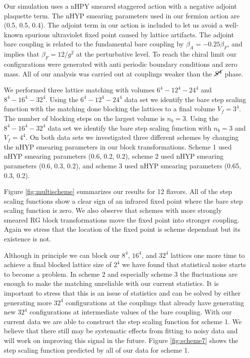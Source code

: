 \documentclass{PoS}
\newcommand{\Sb}{\ensuremath{\cancel{S^4}} }
\begin{document}
Our simulation uses a nHPY smeared staggered action with a negative adjoint plaquette term.
The nHYP smearing parameters used in our fermion action are (0.5, 0.5, 0.4).
The adjoint term in our action is included to let us avoid a well-known spurious ultraviolet fixed point caused by lattice artifacts.
The adjoint bare coupling is related to the fundamental bare coupling by $\beta_A=-0.25\beta_F$, and implies that $\beta_F=12/g^2$ at the perturbative level.
To reach the chiral limit our configurations were generated with anti periodic boundary conditions and zero mass.
All of our analysis was carried out at couplings weaker than the \Sb phase\cite{}.

We performed three lattice matching \cite{} with volumes $6^4-12^4-24^4$ and $8^4-16^4-32^4$.
Using the $6^4-12^4-24^4$ data set we identify the bare step scaling function with the matching done blocking the lattices to a final volume $V_f=3^4$.
The number of blocking steps on the largest volume is $n_b=3$.
Using the $8^4-16^4-32^4$ data set we identify the bare step scaling function with $n_b=3$ and $V_f=4^4$.
On both data sets we investigated three different schemes by changing the nHYP smearing parameters in our block transformations.
Scheme 1 used nHYP smearing parameters (0.6, 0.2, 0.2), scheme 2 used nHYP smearing parameters (0.6, 0.3, 0.2), and scheme 3 used nHYP smearing parameters (0.65, 0.3, 0.2).

Figure \ref{fig:multischeme} summarizes our results for 12 flavors.
All of the step scaling functions show a clear sign of an infrared fixed point where the bare step scaling function is zero.
We also observe that schemes with more strongly smeared RG block transformations move the fixed point into stronger coupling.
Again we stress that the location of the fixed point is scheme dependant but its existence is not.

Although in principle we can block our  $8^4$, $16^4$, and $32^4$ lattices one more time to achieve a final blocked lattice size of $2^4$ we have found that statistical noise starts to become a problem.
In scheme 2 and especially scheme 3 the fluctuations are enough to make the matching unreliable with our current statistics.
It is important to stress that this is an issue of statistics and can be solved by either generating more $32^4$ configurations at the couplings that already have generating new $32^4$ configurations at intermediate values of the bare coupling.
With our current data we are able to construct the step scaling function for scheme 1.
We believe that there still may be systematic effects from fitting to noisy data and will work on improving this signal in the future.
Figure \ref{fig:scheme7} shows the step scaling function predicted by all of our data for scheme 1.
\end{document}
